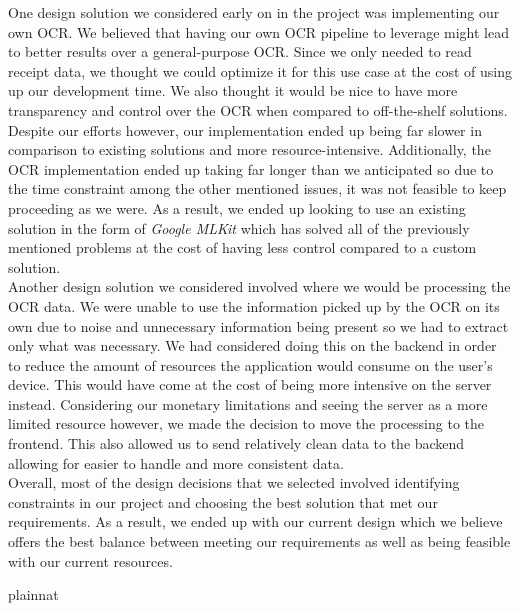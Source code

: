 \documentclass[12pt, titlepage]{article}
\begin{document}
\begin{enumerate}
  One design solution we considered early on in the project was implementing our own OCR. We believed
  that having our own OCR pipeline to leverage might lead to better results over a general-purpose
  OCR. Since we only needed to read receipt data, we thought we could optimize it for this use case
  at the cost of using up our development time. We also thought it would be nice to have more transparency
  and control over the OCR when compared to off-the-shelf solutions. Despite our efforts however, our implementation ended up
  being far slower in comparison to existing solutions and more resource-intensive. Additionally,
  the OCR implementation ended up taking far longer than we anticipated so due to the time constraint among the other mentioned issues,
  it was not feasible to keep proceeding as we were. As a result, we ended up looking to use an existing
  solution in the form of \textit{Google MLKit} which has solved all of the previously mentioned problems
  at the cost of having less control compared to a custom solution. \\

  Another design solution we considered involved where we would be processing the OCR data. We were
  unable to use the information picked up by the OCR on its own due to noise and unnecessary information
  being present so we had to extract only what was necessary. We had considered doing this on the backend
  in order to reduce the amount of resources the application would consume on the user's device. This
  would have come at the cost of being more intensive on the server instead. Considering
  our monetary limitations and seeing the server as a more limited resource however, we made the decision
  to move the processing to the frontend. This also allowed us to send relatively clean data to the backend
  allowing for easier to handle and more consistent data. \\

  Overall, most of the design decisions that we selected involved identifying constraints in our project
  and choosing the best solution that met our requirements. As a result, we ended up with our current
  design which we believe offers the best balance between meeting our requirements as well as being
  feasible with our current resources.
\end{enumerate}

\newpage{}


 {plainnat}


\newpage{}
\end{document}
